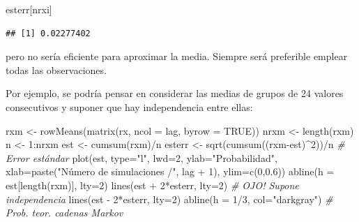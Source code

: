 \documentclass[
]{book}
\newenvironment{Shaded}{\begin{snugshade}}{\end{snugshade}}
\newcommand{\AttributeTok}[1]{\textcolor[rgb]{0.77,0.63,0.00}{#1}}
\newcommand{\CommentTok}[1]{\textcolor[rgb]{0.56,0.35,0.01}{\textit{#1}}}
\newcommand{\ConstantTok}[1]{\textcolor[rgb]{0.00,0.00,0.00}{#1}}
\newcommand{\DecValTok}[1]{\textcolor[rgb]{0.00,0.00,0.81}{#1}}
\newcommand{\FloatTok}[1]{\textcolor[rgb]{0.00,0.00,0.81}{#1}}
\newcommand{\FunctionTok}[1]{\textcolor[rgb]{0.00,0.00,0.00}{#1}}
\newcommand{\NormalTok}[1]{#1}
\newcommand{\OtherTok}[1]{\textcolor[rgb]{0.56,0.35,0.01}{#1}}
\newcommand{\SpecialCharTok}[1]{\textcolor[rgb]{0.00,0.00,0.00}{#1}}
\newcommand{\StringTok}[1]{\textcolor[rgb]{0.31,0.60,0.02}{#1}}
\theoremstyle{break}
\theoremstyle{definition}
\theoremstyle{definition}
\theoremstyle{definition}
\theoremstyle{definition}
\theoremstyle{remark}
\begin{document}
\begin{Shaded}
\begin{Highlighting}[]
\NormalTok{esterr[nrxi]}
\end{Highlighting}
\end{Shaded}

\begin{verbatim}
## [1] 0.02277402
\end{verbatim}

pero no sería eficiente para aproximar la media. Siempre será preferible emplear
todas las observaciones.

Por ejemplo, se podría pensar en considerar las medias de grupos de 24 valores
consecutivos y suponer que hay independencia entre ellas:

\begin{Shaded}
\begin{Highlighting}[]
\NormalTok{rxm }\OtherTok{\textless{}{-}} \FunctionTok{rowMeans}\NormalTok{(}\FunctionTok{matrix}\NormalTok{(rx, }\AttributeTok{ncol =}\NormalTok{ lag, }\AttributeTok{byrow =} \ConstantTok{TRUE}\NormalTok{))}
\NormalTok{nrxm }\OtherTok{\textless{}{-}} \FunctionTok{length}\NormalTok{(rxm)}
\NormalTok{n }\OtherTok{\textless{}{-}} \DecValTok{1}\SpecialCharTok{:}\NormalTok{nrxm}
\NormalTok{est }\OtherTok{\textless{}{-}} \FunctionTok{cumsum}\NormalTok{(rxm)}\SpecialCharTok{/}\NormalTok{n}
\NormalTok{esterr }\OtherTok{\textless{}{-}} \FunctionTok{sqrt}\NormalTok{(}\FunctionTok{cumsum}\NormalTok{((rxm}\SpecialCharTok{{-}}\NormalTok{est)}\SpecialCharTok{\^{}}\DecValTok{2}\NormalTok{))}\SpecialCharTok{/}\NormalTok{n  }\CommentTok{\# Error estándar}
\FunctionTok{plot}\NormalTok{(est, }\AttributeTok{type=}\StringTok{"l"}\NormalTok{, }\AttributeTok{lwd=}\DecValTok{2}\NormalTok{, }\AttributeTok{ylab=}\StringTok{"Probabilidad"}\NormalTok{, }
     \AttributeTok{xlab=}\FunctionTok{paste}\NormalTok{(}\StringTok{"Número de simulaciones /"}\NormalTok{, lag }\SpecialCharTok{+} \DecValTok{1}\NormalTok{), }\AttributeTok{ylim=}\FunctionTok{c}\NormalTok{(}\DecValTok{0}\NormalTok{,}\FloatTok{0.6}\NormalTok{))}
\FunctionTok{abline}\NormalTok{(}\AttributeTok{h =}\NormalTok{ est[}\FunctionTok{length}\NormalTok{(rxm)], }\AttributeTok{lty=}\DecValTok{2}\NormalTok{)}
\FunctionTok{lines}\NormalTok{(est }\SpecialCharTok{+} \DecValTok{2}\SpecialCharTok{*}\NormalTok{esterr, }\AttributeTok{lty=}\DecValTok{2}\NormalTok{) }\CommentTok{\# OJO! Supone independencia}
\FunctionTok{lines}\NormalTok{(est }\SpecialCharTok{{-}} \DecValTok{2}\SpecialCharTok{*}\NormalTok{esterr, }\AttributeTok{lty=}\DecValTok{2}\NormalTok{)}
\FunctionTok{abline}\NormalTok{(}\AttributeTok{h =} \DecValTok{1}\SpecialCharTok{/}\DecValTok{3}\NormalTok{, }\AttributeTok{col=}\StringTok{"darkgray"}\NormalTok{)     }\CommentTok{\# Prob. teor. cadenas Markov}
\end{Highlighting}
\end{Shaded}
\end{document}
